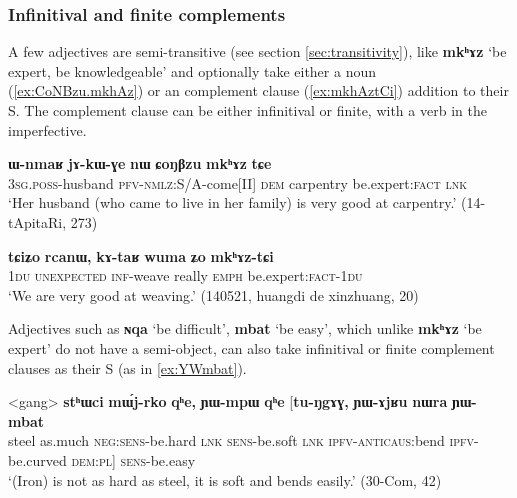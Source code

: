 \documentclass[oneside,a4paper,11pt]{article}
\newcommand{\ipa}[1]{\textbf{\phon#1}} %
\newcommand{\jpg}[2]{\ipa{#1} `#2'} %
\begin{document}
\subsubsection{Infinitival and finite complements} \label{sec:adj.infinitive}
A few adjectives are semi-transitive (see section \ref{sec:transitivity}), like \jpg{mkʰɤz}{be expert, be knowledgeable} and optionally take either a noun (\ref{ex:CoNBzu.mkhAz}) or an complement clause (\ref{ex:mkhAztCi}) addition to their S. The complement clause can be either infinitival or finite, with a verb in the imperfective.

\begin{exe}
\ex \label{ex:CoNBzu.mkhAz}
\gll 
\ipa{ɯ-nmaʁ} 	\ipa{jɤ-kɯ-ɣe} 	\ipa{nɯ} 	\ipa{ɕoŋβzu} 	\ipa{mkʰɤz} 	\ipa{tɕe} \\
\textsc{3sg.poss}-husband \textsc{pfv-nmlz}:S/A-come[II] \textsc{dem} carpentry be.expert:\textsc{fact} \textsc{lnk} \\
\glt `Her husband (who came to live in her family) is very good at carpentry.' (14-tApitaRi, 273)
\end{exe}

\begin{exe}
\ex \label{ex:mkhAztCi}
\gll \ipa{tɕiʑo} 	\ipa{rcanɯ,} 	\ipa{kɤ-taʁ} 	\ipa{wuma} 	\ipa{ʑo} 	\ipa{mkʰɤz-tɕi} 	 \\
\textsc{1du}  \textsc{unexpected} \textsc{inf}-weave really \textsc{emph} be.expert:\textsc{fact}-\textsc{1du} \\
\glt `We are very good at weaving.' (140521, huangdi de xinzhuang, 20)
\end{exe}

Adjectives such as \jpg{ɴqa}{be difficult}, \jpg{mbat}{be easy}, which unlike \jpg{mkʰɤz}{be expert} do not have a semi-object, can also take infinitival or finite complement clauses as their S (as in \ref{ex:YWmbat}).

\begin{exe}
\ex \label{ex:YWmbat}
\gll
<gang> 	\ipa{stʰɯci} 	\ipa{mɯ́j-rko} 	\ipa{qʰe,} 	\ipa{ɲɯ-mpɯ} 	\ipa{qʰe} 	[\ipa{tu-ŋgɤɣ,} 	\ipa{ɲɯ-ɤjʁu} 	\ipa{nɯra} 	\ipa{ɲɯ-mbat} \\
steel as.much \textsc{neg:sens}-be.hard \textsc{lnk} \textsc{sens}-be.soft \textsc{lnk} \textsc{ipfv-anticaus}:bend \textsc{ipfv}-be.curved  \textsc{dem:pl}] \textsc{sens}-be.easy \\
\glt `(Iron) is not as hard as steel, it is soft and bends easily.' (30-Com, 42)
\end{exe}
\end{document}
